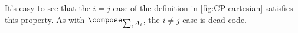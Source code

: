 \noindent It's easy to see that the $i = j$ case of the definition in
\cref{fig:CP-cartesian} satisfies this property. As with $\composefn_{\sum_i
  A_i}$, the $i \ne j$ case is dead code.












